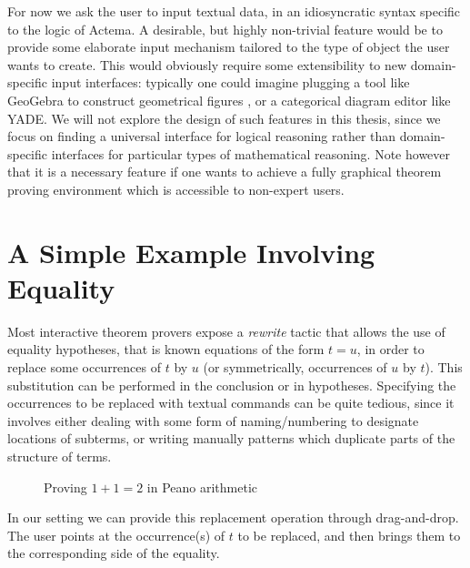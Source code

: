 For now we ask the user to input textual data, in an idiosyncratic syntax
specific to the logic of Actema. A desirable, but highly non-trivial feature
would be to provide some elaborate input mechanism tailored to the type of
object the user wants to create. This would obviously require some extensibility
to new domain-specific input interfaces: typically one could imagine plugging a
tool like GeoGebra to construct geometrical figures \cite{gg2}, or a categorical
diagram editor like YADE. We
will not explore the design of such features in this thesis, since we focus on
finding a universal interface for logical reasoning rather than domain-specific
interfaces for particular types of mathematical reasoning. Note however that it is a necessary feature if one
wants to achieve a fully graphical theorem proving environment which is
accessible to non-expert users.

\section{A Simple Example Involving Equality}

Most interactive theorem provers expose a \emph{rewrite} tactic that allows the
use of equality hypotheses, that is known equations of the form $t = u$, in
order to replace some occurrences of $t$ by $u$ (or symmetrically, occurrences
of $u$ by $t$). This substitution can be performed in the conclusion or in
hypotheses. Specifying the occurrences to be replaced with textual commands can
be quite tedious, since it involves either dealing with some form of
naming/numbering to designate locations of subterms, or writing manually
patterns which duplicate parts of the structure of terms.

\begin{figure*}
  \begin{center}
  \end{center}
  \caption{Proving $1 + 1 = 2$ in Peano arithmetic}
\end{figure*}

In our setting we can provide this replacement operation through
drag-and-drop. The user points at the occurrence(s) of $t$ to be
replaced, and then brings them to the corresponding side of the
equality.

